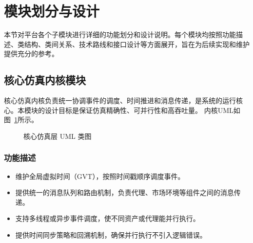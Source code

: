 \section{模块划分与设计}

本节对平台各个子模块进行详细的功能划分和设计说明。每个模块均按照功能描述、类结构、类间关系、技术路线和接口设计等方面展开，旨在为后续实现和维护提供充分的参考。

\subsection{核心仿真内核模块}

核心仿真内核负责统一协调事件的调度、时间推进和消息传递，是系统的运行核心。本模块的设计目标是保证仿真精确性、可并行性和高吞吐量。
内核UML如图~\ref{fig:uml_core}所示。

\begin{figure}[htbp]
  \centering
  \resizebox{0.7\linewidth}{!}{}
  \caption{核心仿真层 UML 类图}
  \label{fig:uml_core}
\end{figure}

\subsubsection{功能描述}
\begin{itemize}
  \item 维护全局虚拟时间（GVT），按照时间戳顺序调度事件。
  \item 提供统一的消息队列和路由机制，负责代理、市场环境等组件之间的消息传递。
  \item 支持多线程或异步事件调度，使不同资产或代理能并行执行。
  \item 提供时间同步策略和回溯机制，确保并行执行不引入逻辑错误。
\end{itemize}

